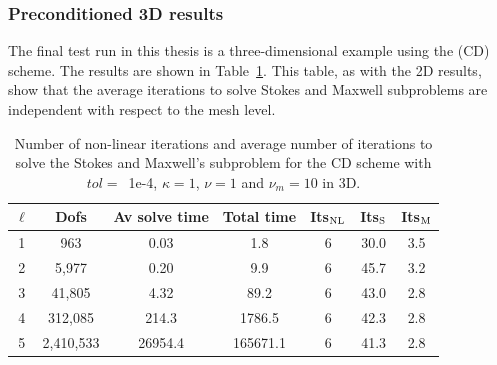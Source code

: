 \subsubsection{Preconditioned 3D results}
The final test run in this thesis is a three-dimensional example using the (CD) scheme. The results are shown in Table~\ref{tab:CD3D_large_scale}. This table, as with the 2D results, show that the average iterations to solve Stokes and Maxwell subproblems are independent with respect to the mesh level.
\begin{table}[h!] \small
\begin{center}
\begin{tabular}{ccccccc}
\hline
 $\ell$ &    Dofs &  Av solve time &  Total time &   Its$_{\rm NL}$ &     Its$_{\rm S}$ &    Its$_{\rm M}$\\
\hline
 1 &    963 &       0.03 & 1.8 & 6 &        30.0 &        3.5 \\
 2 &   5,977 &       0.20 & 9.9 &                  6 &        45.7 &        3.2 \\
 3 &  41,805 &       4.32 & 89.2 & 6 &        43.0 &        2.8 \\
  4 &  312,085 &     214.3 &         1786.5 & 6 &     42.3 &        2.8 \\
5 &  2,410,533 &   26954.4 &       165671.1 & 6 &        41.3 &        2.8 \\
\hline
\end{tabular}
\caption{Number of non-linear iterations and average number of iterations to solve the Stokes and Maxwell's subproblem for the CD scheme with $tol=$~1e-4, $\kappa = 1$, $\nu = 1$ and $\nu_m = 10$ in 3D.}
\label{tab:CD3D_large_scale}
\end{center}
\end{table}



